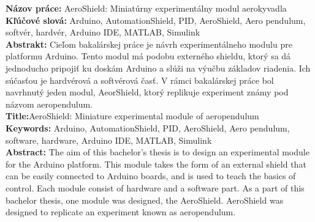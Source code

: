 \noindent
\textbf{Názov práce:} AeroShield: Miniatúrny experimentálny modul aerokyvadla\\
\textbf{Kľúčové slová: } Arduino, AutomationShield, PID, AeroShield, Aero pendulum, softvér, hardvér, Arduino IDE, MATLAB, Simulink \\
\textbf{Abstrakt: } Cieľom bakalárskej práce je návrh experimentálneho modulu pre platformu Arduino. Tento modul má podobu externého shieldu, ktorý sa dá jednoducho pripojiť ku doskám Arduino a slúži na výučbu základov riadenia. Ich súčasťou je hardvérová a softvérová časť. V rámci bakalárskej práce bol navrhnutý jeden modul, AeorShield, ktorý replikuje experiment známy pod názvom aeropendulum.\\

\noindent
\textbf{Title:}AeroShield: Miniature experimental module of aeropendulum \\
\textbf{Keywords: }  Arduino, AutomationShield, PID, AeroShield, Aero pendulum, software, hardware, Arduino IDE, MATLAB, Simulink\\
\textbf{Abstract: } The aim of this bachelor's thesis is to design an experimental module for the Arduino platform. This module takes the form of an external shield that can be easily connected to Arduino boards, and is used to teach the basics of control. Each module consist of hardware and a software part. As a part of this bachelor thesis, one module was designed, the AeroShield. AeroShield was designed to replicate an experiment known as aeropendulum.
\cleardoublepage
